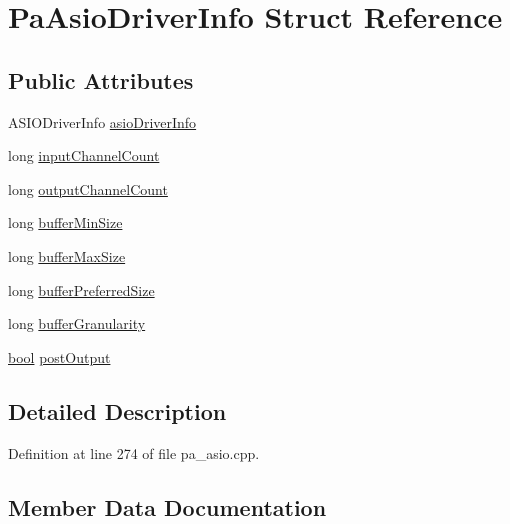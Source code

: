 \hypertarget{struct_pa_asio_driver_info}{}\section{Pa\+Asio\+Driver\+Info Struct Reference}
\label{struct_pa_asio_driver_info}
\subsection*{Public Attributes}
\begin{DoxyCompactItemize}
\item 
A\+S\+I\+O\+Driver\+Info \hyperlink{struct_pa_asio_driver_info_ac27f7fa26c857dc5a9e92448c57f57cd}{asio\+Driver\+Info}
\item 
long \hyperlink{struct_pa_asio_driver_info_a0a647be77ba5229d7fc0e308a4d6f052}{input\+Channel\+Count}
\item 
long \hyperlink{struct_pa_asio_driver_info_afa1f7776a464da1766ac5c23198e01fb}{output\+Channel\+Count}
\item 
long \hyperlink{struct_pa_asio_driver_info_a316045d2b43b71ec8bbd0d094c12b08a}{buffer\+Min\+Size}
\item 
long \hyperlink{struct_pa_asio_driver_info_a5742e81d8d2a285a000686b166cd00d4}{buffer\+Max\+Size}
\item 
long \hyperlink{struct_pa_asio_driver_info_aabf41e27226680dc49d3cdb2e908b236}{buffer\+Preferred\+Size}
\item 
long \hyperlink{struct_pa_asio_driver_info_a472b26aa53958e911d3cd61edeb2c6d9}{buffer\+Granularity}
\item 
\hyperlink{mac_2config_2i386_2lib-src_2libsoxr_2soxr-config_8h_abb452686968e48b67397da5f97445f5b}{bool} \hyperlink{struct_pa_asio_driver_info_a8570f0d4e09e8e76cc1d95a295210f19}{post\+Output}
\end{DoxyCompactItemize}


\subsection{Detailed Description}


Definition at line 274 of file pa\+\_\+asio.\+cpp.



\subsection{Member Data Documentation}
